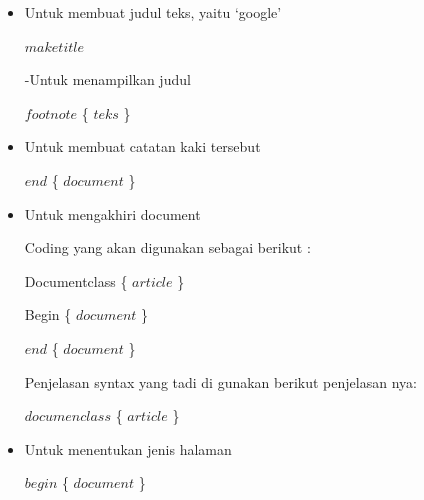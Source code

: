 \begin{itemize}
\vspace{\baselineskip}
	\item Untuk membuat judul teks, yaitu ‘google’\par

$maketitle$\par

\vspace{\baselineskip}
-Untuk menampilkan judul\par

\vspace{\baselineskip}
$footnote$ \{ $teks$ \} \par

\vspace{\baselineskip}
	\item Untuk membuat catatan kaki tersebut\par

\vspace{\baselineskip}
$end$ \{ $document$ \} \par
	\item Untuk mengakhiri document\par

\vspace{\baselineskip}
Coding yang akan digunakan sebagai berikut :\par

\vspace{\baselineskip}
Documentclass \{ $article$ \} \par

\vspace{\baselineskip}
Begin \{ $document$ \} \par

\vspace{\baselineskip}
$end$ \{ $document$ \} \par

\vspace{\baselineskip}
Penjelasan syntax yang tadi di gunakan berikut penjelasan nya:\par

\vspace{\baselineskip}
$documenclass$ \{ $article$ \} \par

\vspace{\baselineskip}
	\item Untuk menentukan jenis halaman\par


$begin$ \{ $document$ \} \par


\end{itemize}
